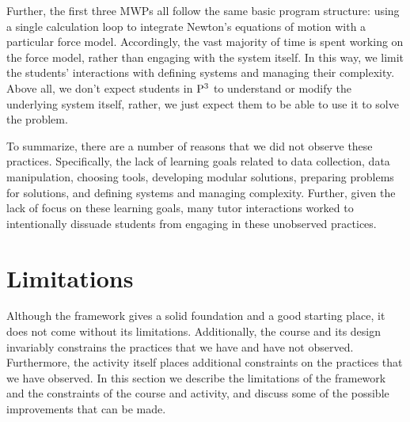 \documentclass{msuphddissertation}
\begin{document}
\begin{doublespace}
Further, the first three MWPs all follow the same basic program structure: using a single calculation loop to integrate Newton's equations of motion with a particular force model.  Accordingly, the vast majority of time is spent working on the force model, rather than engaging with the system itself.  In this way, we limit the students' interactions with defining systems and managing their complexity.  Above all, we don't expect students in ${\rm P}^{3}$ to understand or modify the underlying system itself, rather, we just expect them to be able to use it to solve the problem.

To summarize, there are a number of reasons that we did not observe these practices.  Specifically, the lack of learning goals related to data collection, data manipulation, choosing tools, developing modular solutions, preparing problems for solutions, and defining systems and managing complexity.  Further, given the lack of focus on these learning goals, many tutor interactions worked to intentionally dissuade students from engaging in these unobserved practices.

%
%
%
%
%
%
%
%
%
%
%
%
%
%
%
%

\section{Limitations}

Although the framework gives a solid foundation and a good starting place, it does not come without its limitations.  Additionally, the course and its design invariably constrains the practices that we have and have not observed.  Furthermore, the activity itself places additional constraints on the practices that we have observed.  In this section we describe the limitations of the framework and the constraints of the course and activity, and discuss some of the possible improvements that can be made.



\end{doublespace}
\end{document}
